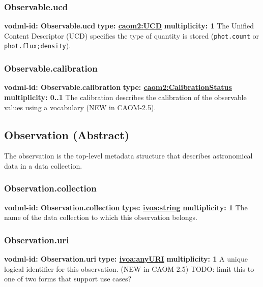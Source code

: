     \subsubsection{Observable.ucd}
      \textbf{vodml-id: Observable.ucd} \newline
      \textbf{type: \hyperref[sect:UCD]{caom2:UCD}} \newline
      \textbf{multiplicity: 1} \newline
      The Unified Content Descriptor (UCD) specifies the type of quantity is stored (\verb|phot.count| or \verb|phot.flux;density|).

    \subsubsection{Observable.calibration}
      \textbf{vodml-id: Observable.calibration} \newline
      \textbf{type: \hyperref[sect:CalibrationStatus]{caom2:CalibrationStatus}} \newline
      \textbf{multiplicity: 0..1} \newline
      The calibration describes the calibration of the observable values using a vocabulary (NEW in CAOM-2.5).

  \subsection{Observation (Abstract)}
  \label{sect:Observation}
    The observation is the top-level metadata structure that describes astronomical data in a data collection.

    \subsubsection{Observation.collection}
      \textbf{vodml-id: Observation.collection} \newline
      \textbf{type: \hyperref[sect:ivoa]{ivoa:string}} \newline
      \textbf{multiplicity: 1} \newline
      The name of the data collection to which this observation belongs.

    \subsubsection{Observation.uri}
      \textbf{vodml-id: Observation.uri} \newline
      \textbf{type: \hyperref[sect:ivoa]{ivoa:anyURI}} \newline
      \textbf{multiplicity: 1} \newline
      A unique logical identifier for this observation. (NEW in CAOM-2.5) TODO: limit this to one of two forms that support use cases?

